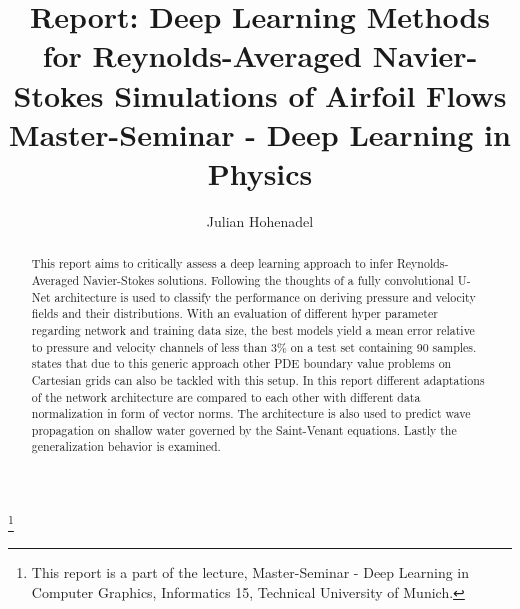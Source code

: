 \documentclass[acmtog]{techreportacmart}
\begin{document}
\title{Report: Deep Learning Methods for Reynolds-Averaged Navier-Stokes Simulations of
Airfoil Flows \\ Master-Seminar - Deep Learning in Physics} 
\author{Julian Hohenadel}

\renewcommand\shortauthors{Hohenadel}

\begin{abstract}
This report aims to critically assess a deep learning approach to infer Reynolds-Averaged Navier-Stokes 
solutions. Following the thoughts of \cite{Thuerey20} a fully convolutional U-Net architecture is used 
to classify the performance on deriving pressure and velocity fields and their distributions. With an 
evaluation of different hyper parameter regarding network and training data size, the best models yield 
a mean error relative to pressure and velocity channels of less than 3\% on a test set containing 90 
samples. \cite{Thuerey20} states that due to this generic approach other PDE boundary value problems 
on Cartesian grids can also be tackled with this setup. In this report different adaptations of the 
network architecture are compared to each other with different data normalization in form of vector 
norms. The architecture is also used to predict wave propagation on shallow water governed by the 
Saint-Venant equations. Lastly the generalization behavior is examined.
\end{abstract}

%
%



\thanks{This report is a part of the lecture, Master-Seminar - Deep Learning in
  Computer Graphics, Informatics 15, Technical University of Munich.}


\maketitle
\end{document}
